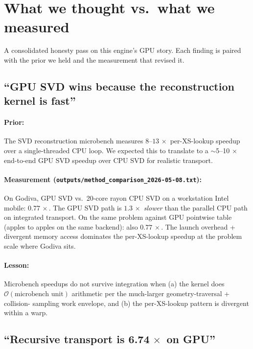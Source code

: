 \section{What we thought vs.\ what we measured}
\label{sec:honest}

A consolidated honesty pass on this engine's GPU story. Each
finding is paired with the prior we held and the measurement that
revised it.

\subsection{``GPU SVD wins because the reconstruction kernel is fast''}

\paragraph{Prior:} The SVD reconstruction microbench measures
$8$--$13\,\times$ per-XS-lookup speedup over a single-threaded CPU
loop. We expected this to translate to a $\sim$5--10$\,\times$
end-to-end GPU SVD speedup over CPU SVD for realistic transport.

\paragraph{Measurement (\texttt{outputs/method\_comparison\_2026-05-08.txt}):}
On Godiva, GPU SVD vs.\ 20-core rayon CPU SVD on a workstation Intel
mobile: $0.77\,\times$. The GPU SVD path is $1.3\,\times$
\emph{slower} than the parallel CPU path on integrated transport.
On the same problem against GPU pointwise table (apples to apples
on the same backend): also $0.77\,\times$. The launch overhead +
divergent memory access dominates the per-XS-lookup speedup at the
problem scale where Godiva sits.

\paragraph{Lesson:} Microbench speedups do not survive integration
when (a) the kernel does $\mathcal{O}(\text{microbench unit})$
arithmetic per the much-larger geometry-traversal + collision-
sampling work envelope, and (b) the per-XS-lookup pattern is
divergent within a warp.

\subsection{``Recursive transport is 6.74$\,\times$ on GPU''}

